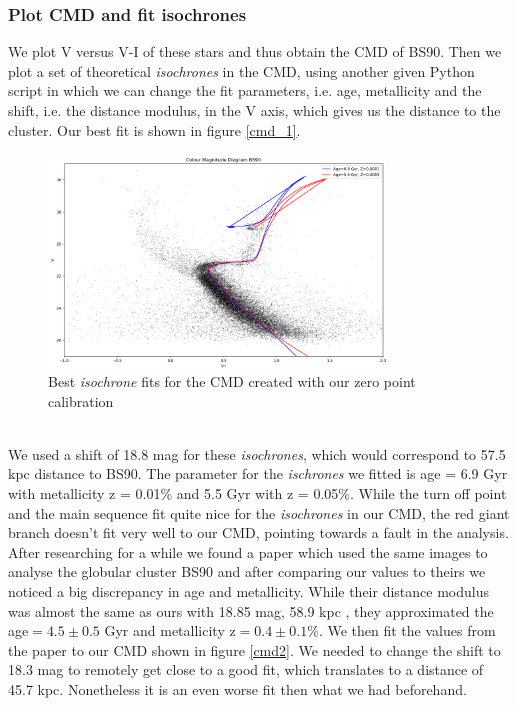 \subsubsection{Plot CMD and fit isochrones}
We plot V versus V-I of these stars and thus obtain the CMD of BS90. Then we plot a set of theoretical \textit{isochrones} in the CMD, using another given Python script in which we can change the fit parameters, i.e. age, metallicity and the shift, i.e. the distance modulus, in the V axis, which gives us the distance to the cluster. Our best fit is shown in figure \ref{cmd_1}. 
\begin{figure}[h]
	\centering
	\includegraphics[width=0.8\textwidth]{report_pictures/CMDOwn.png}
	\caption{Best \textit{isochrone} fits for the CMD created with our zero point calibration}
	\label{cmd1}
\end{figure}
\vspace{3mm}\\
We used a shift of 18.8 mag for these \textit{isochrones}, which would correspond to 57.5 kpc distance to BS90. The parameter for the \textit{ischrones} we fitted is age = 6.9 Gyr with metallicity z = 0.01\% and 5.5 Gyr with z = 0.05\%. While the turn off point and the main sequence fit quite nice for the \textit{isochrones} in our CMD, the red giant branch doesn't fit very well to our CMD, pointing towards a fault in the analysis.
\vspace{2mm}\\
After researching for a while we found a paper \cite{rochau2007star} which used the same images to analyse the globular cluster BS90 and after comparing our values to theirs we noticed a big discrepancy in age and metallicity. While their distance modulus was almost the same as ours with 18.85 mag, 58.9 kpc , they approximated the age$=4.5 \pm 0.5$ Gyr and metallicity z$=0.4 \pm 0.1$\%. We then fit the values from the paper to our CMD shown in figure \ref{cmd2}. We needed to change the shift to 18.3 mag to remotely get close to a good fit, which translates to a distance of 45.7 kpc. Nonetheless it is an even worse fit then what we had beforehand.
